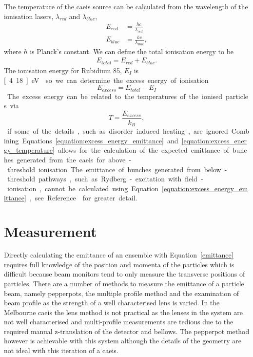 The temperature of the \gls{caeis} source can be calculated from the wavelength of the ionisation lasers, $\lambda_{red}$ and $\lambda_{blue}$,
\begin{align}
 E_{red} &= \frac{hc}{\lambda_{red}} \\
 E_{blue}&= \frac{hc}{\lambda_{blue}},
\end{align}
where $h$ is Planck's constant.
We can define the total ionisation energy to be
\begin{align}
E_{total} = E_{red} + E_{blue}.
\end{align}
The ionisation energy for Rubidium 85, $E_I$ is \unit[4.18]{eV}~\cite{steck_rubidium_2008} so we can determine the excess energy of ionisation
\begin{equation}
E_{excess} = E_{total} - E_I
\end{equation}

The excess energy can be related to the temperatures of the ionised particles via
\begin{equation}\label{equation:excess_energy_temperature}
T = \frac{E_{excess}}{k_B},
\end{equation}
if some of the details, such as disorder induced heating, are ignored.
Combining Equations \ref{equation:excess_energy_emittance} and \ref{equation:excess_energy_temperature} allows for the calculation of the expected emittance of bunches generated from the \gls{caeis} for above-threshold ionisation.
The emittance of bunches generated from below-threshold pathways, such as Rydberg-excitation with field-ionisation, cannot be calculated using Equation~\ref{equation:excess_energy_emittance}, see Reference~\cite{mcculloch_field_2017} for greater detail.

\section{Measurement}

Directly calculating the emittance of an ensemble with Equation~\ref{emittance} requires full knowledge of the position and momenta of the particles which is difficult because beam monitors tend to only measure the transverse positions of particles.
There are a number of methods to measure the emittance of a particle beam, namely pepperpots, the multiple profile method and the examination of beam profile as the strength of a well characterised lens is varied.
In the Melbourne \gls{caeis} the lens method is not practical as the lenses in the system are not well characterised and multi-profile measurements are tedious due to the required manual z-translation of the detector and bellows.
The pepperpot method however is achievable with this system although the details of the geometry are not ideal with this iteration of a \gls{caeis}.

